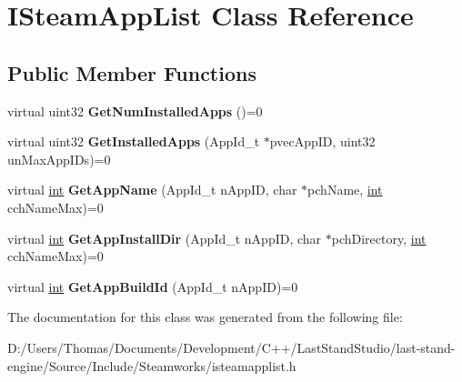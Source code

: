 \hypertarget{classISteamAppList}{}\section{I\+Steam\+App\+List Class Reference}
\label{classISteamAppList}
\subsection*{Public Member Functions}
\begin{DoxyCompactItemize}
\item 
\hypertarget{classISteamAppList_a165e2325d1dd24788f4674a8ac02ec6e}{}virtual uint32 {\bfseries Get\+Num\+Installed\+Apps} ()=0\label{classISteamAppList_a165e2325d1dd24788f4674a8ac02ec6e}

\item 
\hypertarget{classISteamAppList_ac413f953622477697676604c284d2d6a}{}virtual uint32 {\bfseries Get\+Installed\+Apps} (App\+Id\+\_\+t $\ast$pvec\+App\+I\+D, uint32 un\+Max\+App\+I\+Ds)=0\label{classISteamAppList_ac413f953622477697676604c284d2d6a}

\item 
\hypertarget{classISteamAppList_abe0e9ef74f247980bad3a9078d401375}{}virtual \hyperlink{SDL__thread_8h_a6a64f9be4433e4de6e2f2f548cf3c08e}{int} {\bfseries Get\+App\+Name} (App\+Id\+\_\+t n\+App\+I\+D, char $\ast$pch\+Name, \hyperlink{SDL__thread_8h_a6a64f9be4433e4de6e2f2f548cf3c08e}{int} cch\+Name\+Max)=0\label{classISteamAppList_abe0e9ef74f247980bad3a9078d401375}

\item 
\hypertarget{classISteamAppList_a505e71d522ca0a799908f38b27887842}{}virtual \hyperlink{SDL__thread_8h_a6a64f9be4433e4de6e2f2f548cf3c08e}{int} {\bfseries Get\+App\+Install\+Dir} (App\+Id\+\_\+t n\+App\+I\+D, char $\ast$pch\+Directory, \hyperlink{SDL__thread_8h_a6a64f9be4433e4de6e2f2f548cf3c08e}{int} cch\+Name\+Max)=0\label{classISteamAppList_a505e71d522ca0a799908f38b27887842}

\item 
\hypertarget{classISteamAppList_a7528fa95f03c77dccf312bdaf3172475}{}virtual \hyperlink{SDL__thread_8h_a6a64f9be4433e4de6e2f2f548cf3c08e}{int} {\bfseries Get\+App\+Build\+Id} (App\+Id\+\_\+t n\+App\+I\+D)=0\label{classISteamAppList_a7528fa95f03c77dccf312bdaf3172475}

\end{DoxyCompactItemize}


The documentation for this class was generated from the following file\+:\begin{DoxyCompactItemize}
\item 
D\+:/\+Users/\+Thomas/\+Documents/\+Development/\+C++/\+Last\+Stand\+Studio/last-\/stand-\/engine/\+Source/\+Include/\+Steamworks/isteamapplist.\+h\end{DoxyCompactItemize}
